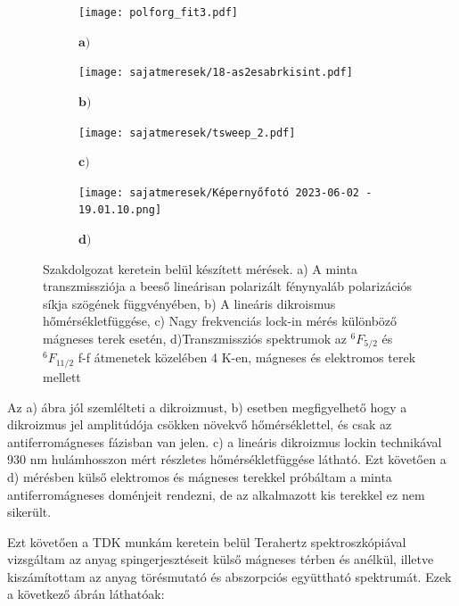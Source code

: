 \documentclass[a4paper,12pt]{article}
\numberwithin{equation}{section}
\begin{document}
\begin{figure}[H]
  \centering

  \begin{subfigure}[b]{0.28\textwidth}
  
    \caption*{$\bm{a)}$}
    \centering
    \texttt{[image: polforg\_fit3.pdf]}
  \end{subfigure}
  \hfill
  \begin{subfigure}[b]{0.48\textwidth}
  \caption*{$\bm{b)}$}
    \centering
    \texttt{[image: sajatmeresek/18-as2esabrkisint.pdf]}
  \end{subfigure}
  
  \vspace{-4pt} %
  
   \begin{subfigure}[b]{0.48\textwidth}
    \caption*{$\bm{c)}$}
    \centering
    \texttt{[image: sajatmeresek/tsweep\_2.pdf]}
  \end{subfigure}
  \hfill
  \begin{subfigure}[b]{0.48\textwidth}
  \caption*{$\bm{d)}$}
    \centering
    \texttt{[image: sajatmeresek/Képernyőfotó 2023-06-02 - 19.01.10.png]}
  \end{subfigure}
  
  \caption{Szakdolgozat keretein belül készített mérések. a) A minta transzmissziója a beeső lineárisan polarizált fénynyaláb polarizációs síkja szögének függvényében, b) A lineáris dikroismus hőmérsékletfüggése, c) Nagy frekvenciás lock-in mérés különböző mágneses terek esetén, d)Transzmissziós spektrumok az $^6F_{5/2}$ és $^6F_{11/2}$  f-f átmenetek közelében 4 K-en, mágneses és elektromos terek mellett}
  \label{fig:szakdoga}
\end{figure}

Az a) ábra jól szemlélteti a dikroizmust, b) esetben megfigyelhető hogy a dikroizmus jel amplitúdója csökken növekvő hőmérséklettel, és csak az antiferromágneses fázisban van jelen. c) a lineáris dikroizmus lockin technikával 930 nm hulámhosszon mért részletes hőmérsékletfüggése látható. Ezt követően a d) mérésben külső elektromos és mágneses terekkel próbáltam a minta antiferromágneses doménjeit rendezni, de az alkalmazott kis terekkel ez nem sikerült.



Ezt követően a TDK munkám keretein belül Terahertz spektroszkópiával vizsgáltam az anyag spingerjesztéseit külső mágneses térben és anélkül, illetve kiszámítottam az anyag törésmutató és abszorpciós együttható spektrumát. Ezek a következő ábrán láthatóak:
\end{document}
